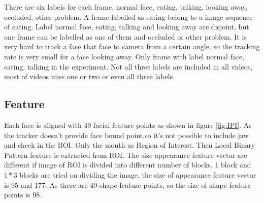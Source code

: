 \newline
There are six labels for each frame, normal face, eating, talking, looking away, occluded, other problem. A frame labelled as eating belong to a image sequence of eating. Label normal face, eating, talking and looking away are disjoint, but one frame can be labelled as one of them and occluded or other problem. It is very hard to track a face that face to camera from a certain angle, so the tracking rate is very small for a face looking away. Only frame with label normal face, eating, talking in the experiment. Not all three labels are included in all videos, most of videos miss one or two or even all three labels.
\subsection{Feature}
Each face is aligned with 49 facial feature points as shown in figure \ref{fig:IPI}. As the tracker doesn't provide face bound point,so it's not possible to include jaw and cheek in the ROI.  Only the mouth as Region of Interest. Then Local Binary Pattern feature is extracted from ROI. The size appearance feature vector are different if image of ROI is divided into different number of blocks. 1 block and $1*3$ blocks are tried on dividing the image, the size of appearance feature vector is 95 and 177. As there are 49 shape feature points, so the size of shape feature points is 98.
